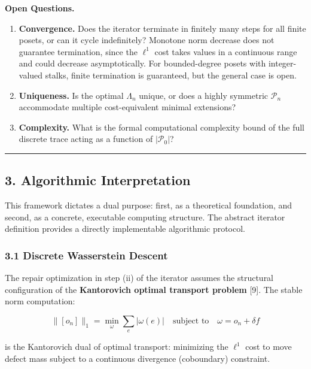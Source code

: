 \documentclass[
]{article}
\providecommand{\tightlist}{%
  \setlength{\itemsep}{0pt}\setlength{\parskip}{0pt}}
\begin{document}
\textbf{Open Questions.}

\begin{enumerate}
\def\labelenumi{\arabic{enumi}.}
\tightlist
\item
  \textbf{Convergence.} Does the iterator terminate in finitely many
  steps for all finite posets, or can it cycle indefinitely? Monotone
  norm decrease does not guarantee termination, since the \(\ell^1\)
  cost takes values in a continuous range and could decrease
  asymptotically. For bounded-degree posets with integer-valued stalks,
  finite termination is guaranteed, but the general case is open.
\item
  \textbf{Uniqueness.} Is the optimal \(\Lambda_n\) unique, or does a
  highly symmetric \(\mathcal{P}_n\) accommodate multiple
  cost-equivalent minimal extensions?
\item
  \textbf{Complexity.} What is the formal computational complexity bound
  of the full discrete trace acting as a function of
  \(|\mathcal{P}_0|\)?
\end{enumerate}

\begin{center}\rule{0.5\linewidth}{0.5pt}\end{center}

\subsection{3. Algorithmic
Interpretation}\label{algorithmic-interpretation}

This framework dictates a dual purpose: first, as a theoretical
foundation, and second, as a concrete, executable computing structure.
The abstract iterator definition provides a directly implementable
algorithmic protocol.

\subsubsection{3.1 Discrete Wasserstein
Descent}\label{discrete-wasserstein-descent}

The repair optimization in step (ii) of the iterator assumes the
structural configuration of the \textbf{Kantorovich optimal transport
problem} {[}9{]}. The stable norm computation:

\[\|[o_n]\|_1 = \min_{\omega} \sum_e |\omega(e)| \quad \text{subject to} \quad \omega = o_n + \delta f\]

is the Kantorovich dual of optimal transport: minimizing the \(\ell^1\)
cost to move defect mass subject to a continuous divergence (coboundary)
constraint.
\end{document}
